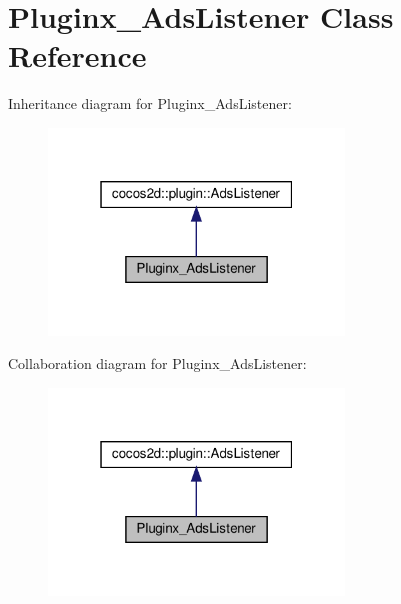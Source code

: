 \hypertarget{classPluginx__AdsListener}{}\section{Pluginx\+\_\+\+Ads\+Listener Class Reference}
\label{classPluginx__AdsListener}


Inheritance diagram for Pluginx\+\_\+\+Ads\+Listener\+:
\nopagebreak
\begin{figure}[H]
\begin{center}
\leavevmode
\includegraphics[width=223pt]{classPluginx__AdsListener__inherit__graph}
\end{center}
\end{figure}


Collaboration diagram for Pluginx\+\_\+\+Ads\+Listener\+:
\nopagebreak
\begin{figure}[H]
\begin{center}
\leavevmode
\includegraphics[width=223pt]{classPluginx__AdsListener__coll__graph}
\end{center}
\end{figure}
